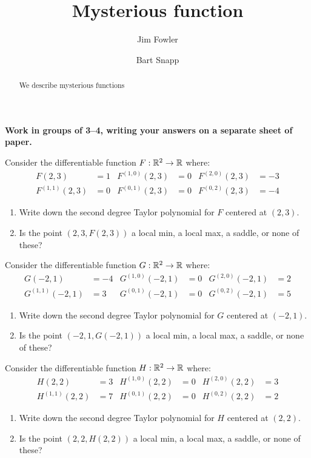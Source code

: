 \documentclass{ximera}
\author{Jim Fowler \and Bart Snapp}
\title{Mysterious function}
\begin{document}
\begin{abstract}
  We describe  mysterious functions
\end{abstract}
\maketitle

\textbf{Work in groups of 3--4, writing your answers on a separate
  sheet of paper.}

\begin{problem}
Consider the differentiable function $F:\mathbb R^2\to\mathbb R$ where:
\begin{align*}
  F(2,3) &= 1        &  F^{(1,0)}(2,3) &= 0 & F^{(2,0)}(2,3) &= -3\\
  F^{(1,1)}(2,3) &=0 &  F^{(0,1)}(2,3) &= 0 & F^{(0,2)}(2,3) &= -4  
\end{align*}
\begin{enumerate}
\item Write down the second degree Taylor polynomial for $F$ centered at $(2,3)$.
\item Is the point $(2,3,F(2,3))$ a local min, a local max, a saddle,
  or none of these?
\end{enumerate}
\end{problem}


\begin{problem}
Consider the differentiable function $G:\mathbb R^2\to\mathbb R$ where:
\begin{align*}
  G(-2,1) &= -4       &  G^{(1,0)}(-2,1) &= 0 & G^{(2,0)}(-2,1) &= 2\\
  G^{(1,1)}(-2,1) &=3 &  G^{(0,1)}(-2,1) &= 0 & G^{(0,2)}(-2,1) &= 5  
\end{align*}
\begin{enumerate}
\item Write down the second degree Taylor polynomial for $G$ centered at $(-2,1)$.
\item Is the point $(-2,1,G(-2,1))$ a local min, a local max, a saddle,
  or none of these?
\end{enumerate}
\end{problem}


\begin{problem}
Consider the differentiable function $H:\mathbb R^2\to\mathbb R$ where:
\begin{align*}
  H(2,2) &= 3       &  H^{(1,0)}(2,2) &= 0 & H^{(2,0)}(2,2) &= 3\\
  H^{(1,1)}(2,2) &=7 &  H^{(0,1)}(2,2) &= 0 & H^{(0,2)}(2,2) &= 2  
\end{align*}
\begin{enumerate}
\item Write down the second degree Taylor polynomial for $H$ centered at $(2,2)$.
\item Is the point $(2,2,H(2,2))$ a local min, a local max, a saddle,
  or none of these?
\end{enumerate}
\end{problem}
\end{document}
